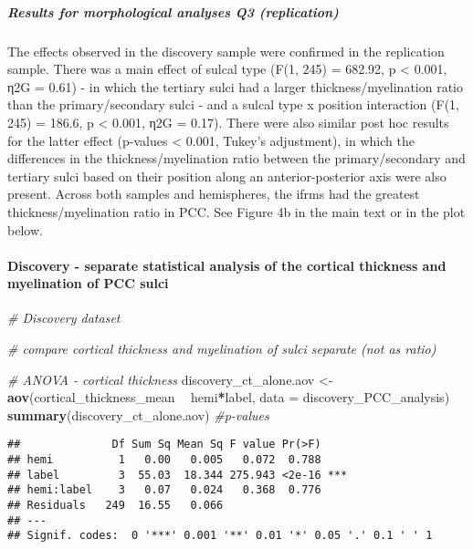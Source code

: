 \documentclass[
]{article}
\newenvironment{Shaded}{\begin{snugshade}}{\end{snugshade}}
\newcommand{\CommentTok}[1]{\textcolor[rgb]{0.56,0.35,0.01}{\textit{#1}}}
\newcommand{\DataTypeTok}[1]{\textcolor[rgb]{0.13,0.29,0.53}{#1}}
\newcommand{\KeywordTok}[1]{\textcolor[rgb]{0.13,0.29,0.53}{\textbf{#1}}}
\newcommand{\NormalTok}[1]{#1}
\newcommand{\OperatorTok}[1]{\textcolor[rgb]{0.81,0.36,0.00}{\textbf{#1}}}
\newcommand{\StringTok}[1]{\textcolor[rgb]{0.31,0.60,0.02}{#1}}
\begin{document}
\hypertarget{results-for-morphological-analyses-q3-replication}{%
\subparagraph{Results for morphological analyses Q3
(replication)}\label{results-for-morphological-analyses-q3-replication}}

The effects observed in the discovery sample were confirmed in the
replication sample. There was a main effect of sulcal type (F(1, 245) =
682.92, p \textless{} 0.001, η2G = 0.61) - in which the tertiary sulci
had a larger thickness/myelination ratio than the primary/secondary
sulci - and a sulcal type x position interaction (F(1, 245) = 186.6, p
\textless{} 0.001, η2G = 0.17). There were also similar post hoc results
for the latter effect (p-values \textless{} 0.001, Tukey's adjustment),
in which the differences in the thickness/myelination ratio between the
primary/secondary and tertiary sulci based on their position along an
anterior-posterior axis were also present. Across both samples and
hemispheres, the ifrms had the greatest thickness/myelination ratio in
PCC. See Figure 4b in the main text or in the plot below.

\hypertarget{discovery---separate-statistical-analysis-of-the-cortical-thickness-and-myelination-of-pcc-sulci}{%
\paragraph{Discovery - separate statistical analysis of the cortical
thickness and myelination of PCC
sulci}\label{discovery---separate-statistical-analysis-of-the-cortical-thickness-and-myelination-of-pcc-sulci}}

\begin{Shaded}
\begin{Highlighting}[]
\CommentTok{# Discovery dataset}

\CommentTok{# compare cortical thickness and myelination of sulci separate (not as ratio)}

\CommentTok{# ANOVA - cortical thickness}
\NormalTok{discovery_ct_alone.aov <-}\StringTok{ }\KeywordTok{aov}\NormalTok{(cortical_thickness_mean }\OperatorTok{~}\StringTok{ }\NormalTok{hemi}\OperatorTok{*}\NormalTok{label, }\DataTypeTok{data =}\NormalTok{ discovery_PCC_analysis)}
\KeywordTok{summary}\NormalTok{(discovery_ct_alone.aov) }\CommentTok{#p-values}
\end{Highlighting}
\end{Shaded}

\begin{verbatim}
##              Df Sum Sq Mean Sq F value Pr(>F)    
## hemi          1   0.00   0.005   0.072  0.788    
## label         3  55.03  18.344 275.943 <2e-16 ***
## hemi:label    3   0.07   0.024   0.368  0.776    
## Residuals   249  16.55   0.066                   
## ---
## Signif. codes:  0 '***' 0.001 '**' 0.01 '*' 0.05 '.' 0.1 ' ' 1
\end{verbatim}
\end{document}

